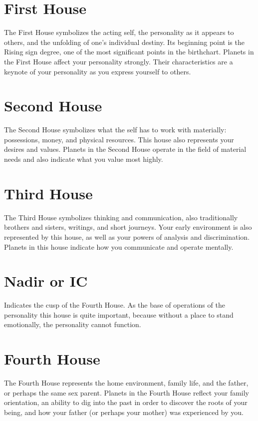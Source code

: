 \documentclass[12pt,twoside,openright]{memoir}
\begin{document}
\section {First House}
The First House symbolizes the acting self, the personality as it appears to others, and the unfolding of one's individual destiny. Its beginning point is the Rising sign degree, one of the most significant points in the birthchart. Planets in the First House affect your personality strongly. Their characteristics are a keynote of your personality as you express yourself to others.

\section {Second House}
The Second House symbolizes what the self has to work with materially: possessions, money, and physical resources. This house also represents your desires and values. Planets in the Second House operate in the field of material needs and also indicate what you value most highly.

\section {Third House}
The Third House symbolizes thinking and communication, also traditionally brothers and sisters, writings, and short journeys. Your early environment is also represented by this house, as well as your powers of analysis and discrimination. Planets in this house indicate how you communicate and operate mentally.

\section {Nadir or IC}
Indicates the cusp of the Fourth House. As the base of operations of the personality this house is quite important, because without a place to stand emotionally, the personality cannot function.

\section {Fourth House}
The Fourth House represents the home environment, family life, and the father, or perhaps the same sex parent. Planets in the Fourth House reflect your family orientation, an ability to dig into the past in order to discover the roots of your being, and how your father (or perhaps your mother) was experienced by you.
\end{document}
